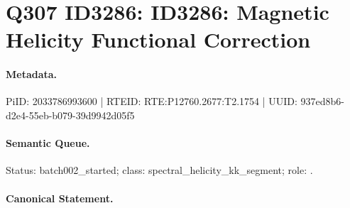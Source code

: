 \section*{Q307 ID3286: ID3286: Magnetic Helicity Functional Correction}
\paragraph{Metadata.}
PiID: 2033786993600 | RTEID: RTE:P12760.2677:T2.1754 | UUID: 937ed8b6-d2e4-55eb-b079-39d9942d05f5

\paragraph{Semantic Queue.}
Status: batch002\_started; class: spectral\_helicity\_kk\_segment; role: .

\paragraph{Canonical Statement.}

